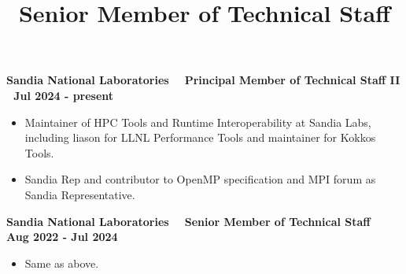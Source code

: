 
\textbf{{Sandia National Laboratories $\>$$\>$$\>$  Principal Member of Technical Staff II $\>$$\>$$\>$Jul 2024 - present}} 
\begin{itemize}
\item Maintainer of HPC Tools and Runtime Interoperability at Sandia Labs, including liason for LLNL Performance Tools and maintainer for Kokkos Tools. 
\item Sandia Rep and contributor to OpenMP specification and MPI forum as Sandia Representative. 
\end{itemize} 
\title{Senior Member of Technical Staff}

\textbf{{Sandia National Laboratories $\>$$\>$$\>$ Senior Member of Technical Staff $\>$$\>$$\>$Aug 2022 - Jul 2024}}
\begin{itemize}
	\item Same as above.

\end{itemize}

